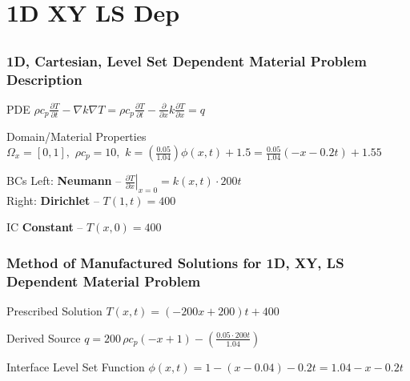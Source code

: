 \documentclass[]{beamer}
\begin{document}
%

\section{1D XY LS Dep}
\subsection{}
\begin{frame}[t]\frametitle{1D, Cartesian, Level Set Dependent Material Problem Description}
  \begin{block}{PDE}
    $\rho c_p\frac{\partial T}{\partial t} - \nabla k \nabla T = \rho c_p\frac{\partial T}{\partial t} - \frac{\partial}{\partial x} k \frac{\partial T}{\partial x}= q$
  \end{block}
  
  \begin{block}{Domain/Material Properties}
  	$\Omega_x = [0,1], \,\, \rho c_p = 10, \,\, k=\left(\frac{0.05}{1.04}\right) \phi(x,t) + 1.5
  	= \frac{0.05}{1.04}\left( - x - 0.2t\right) + 1.55$
  \end{block}
  
  \begin{block}{BCs}
    Left:  \textbf{Neumann} -- $\left. \frac{\partial T}{\partial x}\right|_{x=0} = k(x,t) \cdot 200t$ \\
    Right: \textbf{Dirichlet} -- $T(1,t) = 400$
  \end{block}
  
  \begin{block}{IC}
    \textbf{Constant} -- $T(x,0) = 400$
  \end{block}
\end{frame}

\begin{frame}[t]\frametitle{Method of Manufactured Solutions for 1D, XY, LS Dependent Material Problem}
\begin{block}{Prescribed Solution}
    $T(x,t) = (-200x+200)t + 400$
  \end{block}
  
  \begin{block}{Derived Source}
  $q = 200\,\rho c_p \left(-x+1\right) - \left(\frac{0.05 \cdot 200t}{1.04}\right)$
  \end{block}
  
  \begin{block}{Interface Level Set Function}
    $\phi(x,t) = 1 - (x - 0.04) - 0.2t = 1.04 - x - 0.2t$
  \end{block}
\end{frame}
\end{document}
